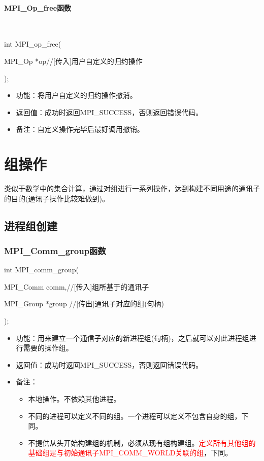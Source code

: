 \documentclass[UTF8]{article}%
\begin{document}
\paragraph{MPI\_Op\_free函数}~{}

int MPI\_op\_free(
    
    \qquad MPI\_Op *op//[传入]用户自定义的归约操作
    
);

\begin{itemize}
    \item 功能：将用户自定义的归约操作撤消。
    \item 返回值：成功时返回MPI\_SUCCESS，否则返回错误代码。
    \item 备注：自定义操作完毕后最好调用撤销。
\end{itemize}

\section{组操作}

类似于数学中的集合计算，通过对组进行一系列操作，达到构建不同用途的通讯子的目的(通讯子操作比较难做到)。

\subsection{进程组创建}

\subsubsection{MPI\_Comm\_group函数}

int MPI\_comm\_group(

    \qquad MPI\_Comm  comm,//[传入]组所基于的通讯子

    \qquad MPI\_Group *group //[传出]通讯子对应的组(句柄)

);

\begin{itemize}
    \item 功能：用来建立一个通信子对应的新进程组(句柄)，之后就可以对此进程组进行需要的操作组。
    \item 返回值：成功时返回MPI\_SUCCESS，否则返回错误代码。
    \item 备注：
    
    {
        \begin{itemize}
            \item 本地操作。不依赖其他进程。
            \item 不同的进程可以定义不同的组。一个进程可以定义不包含自身的组，下同。
            \item 不提供从头开始构建组的机制，必须从现有组构建组。\textcolor{red}{定义所有其他组的基础组是与初始通讯子MPI\_COMM\_WORLD关联的组}，下同。
        \end{itemize}
    }
\end{itemize}
\end{document}
